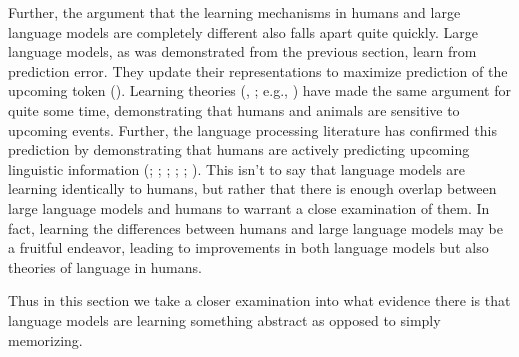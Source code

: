 \documentclass[
  12pt,
  letterpaper,
]{scrreprt}
\begin{document}
Further, the argument that the learning mechanisms in humans and large
language models are completely different also falls apart quite quickly.
Large language models, as was demonstrated from the previous section,
learn from prediction error. They update their representations to
maximize prediction of the upcoming token
().
Learning theories (,
; e.g.,
)
have made the same argument for quite some time, demonstrating that
humans and animals are sensitive to upcoming events. Further, the
language processing literature has confirmed this prediction by
demonstrating that humans are actively predicting upcoming linguistic
information (; ;
; ;
;
). This isn't to say that language models are learning identically
to humans, but rather that there is enough overlap between large
language models and humans to warrant a close examination of them. In
fact, learning the differences between humans and large language models
may be a fruitful endeavor, leading to improvements in both language
models but also theories of language in humans.

Thus in this section we take a closer examination into what evidence
there is that language models are learning something abstract as opposed
to simply memorizing.
\end{document}
